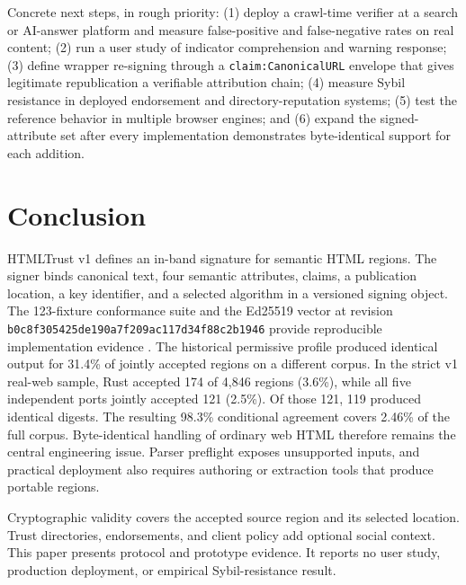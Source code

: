 \documentclass{article}
\begin{document}
Concrete next steps, in rough priority: (1) deploy a crawl-time verifier at a search or AI-answer platform and measure false-positive and false-negative rates on real content; (2) run a user study of indicator comprehension and warning response; (3) define wrapper re-signing through a \texttt{claim:CanonicalURL} envelope that gives legitimate republication a verifiable attribution chain; (4) measure Sybil resistance in deployed endorsement and directory-reputation systems; (5) test the reference behavior in multiple browser engines; and (6) expand the signed-attribute set after every implementation demonstrates byte-identical support for each addition.

\section{Conclusion}

HTMLTrust v1 defines an in-band signature for semantic HTML regions. The signer binds canonical text, four semantic attributes, claims, a publication location, a key identifier, and a selected algorithm in a versioned signing object. The 123-fixture conformance suite and the Ed25519 vector at revision \nolinkurl{b0c8f305425de190a7f209ac117d34f88c2b1946} provide reproducible implementation evidence \cite{HTMLTrustCanon}. The historical permissive profile produced identical output for 31.4\% of jointly accepted regions on a different corpus. In the strict v1 real-web sample, Rust accepted 174 of 4{,}846 regions (3.6\%), while all five independent ports jointly accepted 121 (2.5\%). Of those 121, 119 produced identical digests. The resulting 98.3\% conditional agreement covers 2.46\% of the full corpus. Byte-identical handling of ordinary web HTML therefore remains the central engineering issue. Parser preflight exposes unsupported inputs, and practical deployment also requires authoring or extraction tools that produce portable regions.

Cryptographic validity covers the accepted source region and its selected location. Trust directories, endorsements, and client policy add optional social context. This paper presents protocol and prototype evidence. It reports no user study, production deployment, or empirical Sybil-resistance result.

\printbibliography
\end{document}
